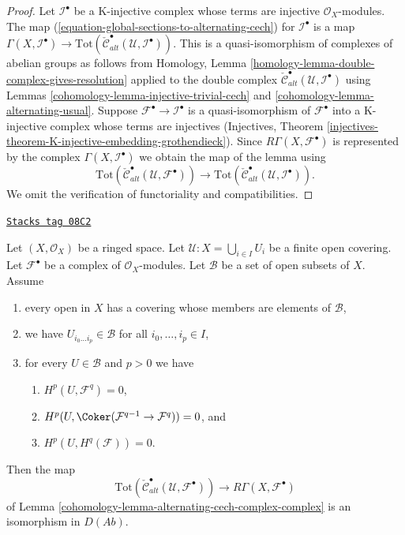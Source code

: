 \begin{proof}

Let ${\mathcal I}^\bullet$ be a K-injective complex whose terms
are injective $\mathcal{O}_X$-modules.
The map (\ref{equation-global-sections-to-alternating-cech}) for
$\mathcal{I}^\bullet$ is a map
$\Gamma(X, {\mathcal I}^\bullet) \to
\text{Tot}(\check{\mathcal{C}}^\bullet_{alt}({\mathcal U},
{\mathcal I}^\bullet))$.
This is a quasi-isomorphism of complexes of abelian groups
as follows from
Homology, Lemma \ref{homology-lemma-double-complex-gives-resolution}
applied to the double complex
$\check{\mathcal{C}}^\bullet_{alt}({\mathcal U},
{\mathcal I}^\bullet)$ using
Lemmas \ref{cohomology-lemma-injective-trivial-cech} and \ref{cohomology-lemma-alternating-usual}.
Suppose ${\mathcal F}^\bullet \to {\mathcal I}^\bullet$ is a quasi-isomorphism
of ${\mathcal F}^\bullet$ into a K-injective complex whose terms
are injectives (Injectives, Theorem
\ref{injectives-theorem-K-injective-embedding-grothendieck}).
Since $R\Gamma(X, {\mathcal F}^\bullet)$ is represented by the complex
$\Gamma(X, {\mathcal I}^\bullet)$ we obtain the map of the lemma
using
$$
\text{Tot}(\check{\mathcal{C}}^\bullet_{alt}({\mathcal U},
{\mathcal F}^\bullet))
\longrightarrow
\text{Tot}(\check{\mathcal{C}}^\bullet_{alt}({\mathcal U},
{\mathcal I}^\bullet)).
$$
We omit the verification of functoriality and compatibilities.
\end{proof}

\begin{lemma}
\label{cohomology-lemma-alternating-cech-complex-complex-ss}
\href{https://stacks.math.columbia.edu/tag/08C2}{\texttt{Stacks tag 08C2}}

Let $(X, \mathcal{O}_X)$ be a ringed space. Let
$\mathcal{U} : X = \bigcup_{i \in I} U_i$ be a finite open covering. Let
$\mathcal{F}^\bullet$ be a complex of $\mathcal{O}_X$-modules.
Let $\mathcal{B}$ be a set of open subsets of $X$. Assume
\begin{enumerate}
\item every open in $X$ has a covering whose members are
elements of $\mathcal{B}$,
\item we have $U_{i_0\ldots i_p} \in \mathcal{B}$ for all
$i_0, \ldots, i_p \in I$,
\item for every $U \in \mathcal{B}$ and $p > 0$ we have
\begin{enumerate}
\item $H^p(U, \mathcal{F}^q) = 0$,
\item $H^p(U, \Coker(\mathcal{F}^{q - 1} \to \mathcal{F}^q)) = 0$, and
\item $H^p(U, H^q(\mathcal{F})) = 0$.
\end{enumerate}
\end{enumerate}
Then the map
$$
\text{Tot}(\check{\mathcal{C}}^\bullet_{alt}(\mathcal{U}, \mathcal{F}^\bullet))
\longrightarrow
R\Gamma(X, \mathcal{F}^\bullet)
$$
of Lemma \ref{cohomology-lemma-alternating-cech-complex-complex}
is an isomorphism in $D(\textit{Ab})$.
\end{lemma}

